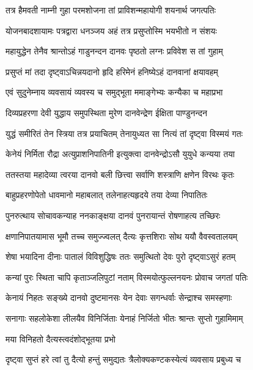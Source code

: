 \twolineshloka
{तत्र हैमवती नाम्नी गुहा परमशोजना}
{तां प्राविशन्महायोगी शयनार्थ जगत्पतिः} %

\twolineshloka
{योजनबादशायामः पत्रद्वारा धनञ्जय}
{अहं तत्र प्रसुप्तोस्मि भयभीतो न संशयः} %

\twolineshloka
{महायुद्धेन तेनैव श्रान्तोऽहं गाडुनन्दन}
{दानवः पृष्ठतो लग्नः प्रविवेश स तां गुहाम्} %

\twolineshloka
{प्रसुप्तं मां तदा दृष्ट्वाऽचिन्नयदानो हृदि}
{हरिमेनं हनिष्येऽहं दानवानां क्षयावहम्} %

\twolineshloka
{एवं सुदुनेम्नाय व्यवसायं व्यवस्य च}
{समुद्भूता ममाङ्गेभ्यः कन्यैका च महाप्रभा} %

\twolineshloka
{दिव्यप्रहरणा देवी युद्धाय समुपस्थिता}
{मुरेण दानवेन्द्रेण ईक्षिता पाण्डुनन्दन} %

\twolineshloka
{युद्धं समीरितं तेन स्त्रिया तत्र प्रयाचितम्}
{तेनायुध्यत सा नित्यं तां दृष्ट्वा विस्मयं गतः} %

\twolineshloka
{केनेयं निर्मिता रौद्रा अत्युप्राशनिपातिनी}
{इत्युक्त्वा दानवेन्द्रोऽसौ युयुधे कन्यया तया} %

\twolineshloka
{ततस्तया महादेव्या त्वरया दानवो बली}
{छित्त्वा सर्वाणि शस्त्राणि क्षणेन विरथः कृतः} %

\twolineshloka
{बाहुप्रहरणोपेतो धावमानो महाबलात्}
{तलेनाहत्यहृदये तया देव्या निपातितः} %

\twolineshloka
{पुनरुत्थाय सोचावकन्याह ननकाङ्क्षया}
{दानवं पुनरायान्तं रोषणाहत्य तच्छिरः} %

\twolineshloka
{क्षणानिपातयामास भूमौ तच्च समुज्ज्वलत्}
{दैत्यः कृत्तशिराः सोथ ययौ वैवस्वतालयम्} %

\twolineshloka
{शेषा भयादिना दीनाः पातालं विविशुद्धिषः}
{ततः समुत्थितो देवः पुरो दृष्ट्वाऽसुरं हतम्} %

\twolineshloka
{कन्यां पुरः स्थिता चापि कृताञ्जलिपुटां नताम्}
{विस्मयोत्फुल्लनयनः प्रोवाच जगतां पतिः} %

\twolineshloka
{केनायं निहतः सङ्ख्ये दानवो दुष्टमानसः}
{येन देवाः सगन्धर्वाः सेन्द्राश्च समस्हणाः} %

\twolineshloka
{सनागाः सहलोकेशा लीलयैव विनिर्जिताः}
{येनाहं निर्जितो भीतः श्रान्तः सुप्तो गुहामिमाम्} %



\onelineshloka
{मया विनिहतो दैत्यस्त्वदंशोद्भूतया प्रभो} %

\twolineshloka
{दृष्ट्वा सुप्तं हरे त्वां तु दैत्यो हन्तुं समुद्यतः}
{त्रैलोक्यकण्टकस्येत्यं व्यवसाय प्रबुध्य च} %


